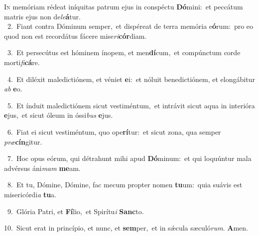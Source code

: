 \lettrine{\initial\textcolor{\initialcolor}{I}}{n} memóriam rédeat iníquitas patrum ejus in conspéctu \textbf{Dó}\-mini:~\star et peccátum matris ejus non de\-\textit{le}\-\textbf{á}tur.\\
{\numbfont\textcolor{\numbcolor}{~2.}}~Fiant contra Dóminum semper,~\dagger et dispéreat de terra memória e\-\textbf{ó}\-rum:~\star pro eo quod non est recordátus fácere mise\-\textit{ri}\-\textbf{cór}diam.\par
{\numbfont\textcolor{\numbcolor}{~3.}}~Et persecútus est hóminem ínopem, et men\-\textbf{dí}\-cum,~\star et compúnctum corde morti\-\textit{fi}\-\textbf{cá}re.\par
{\numbfont\textcolor{\numbcolor}{~4.}}~Et diléxit maledictiónem, et véniet \textbf{e}\-i:~\star et nóluit benedictiónem, et elongábitur \textit{ab} \textbf{e}\-o.\par
{\numbfont\textcolor{\numbcolor}{~5.}}~Et índuit maledictiónem sicut vestiméntum,~\dagger et intrávit sicut aqua in interióra \textbf{e}\-jus,~\star et sicut óleum in óssi\textit{bus} \textbf{e}\-jus.\par
{\numbfont\textcolor{\numbcolor}{~6.}}~Fiat ei sicut vestiméntum, quo ope\-\textbf{rí}\-tur:~\star et sicut zona, qua semper \textit{præ}\-\textbf{cín}gitur.\par
{\numbfont\textcolor{\numbcolor}{~7.}}~Hoc opus eórum, qui détrahunt mihi apud \textbf{Dó}\-minum:~\star et qui loquúntur mala advérsus áni\textit{mam} \textbf{me}\-am.\par
{\numbfont\textcolor{\numbcolor}{~8.}}~Et tu, Dómine, Dómine, fac mecum propter nomen \textbf{tu}\-um:~\star quia suávis est misericórdi\textit{a} \textbf{tu}\-a.\par
{\numbfont\textcolor{\numbcolor}{~9.}}~Glória Patri, et \textbf{Fí}\-lio,~\star et Spirítu\textit{i} \textbf{Sanc}\-to.\par
{\numbfont\textcolor{\numbcolor}{10.}}~Sicut erat in princípio, et nunc, et \textbf{sem}\-per,~\star et in sǽcula sæculó\-\textit{rum}\-. \textbf{A}\-men.\par
